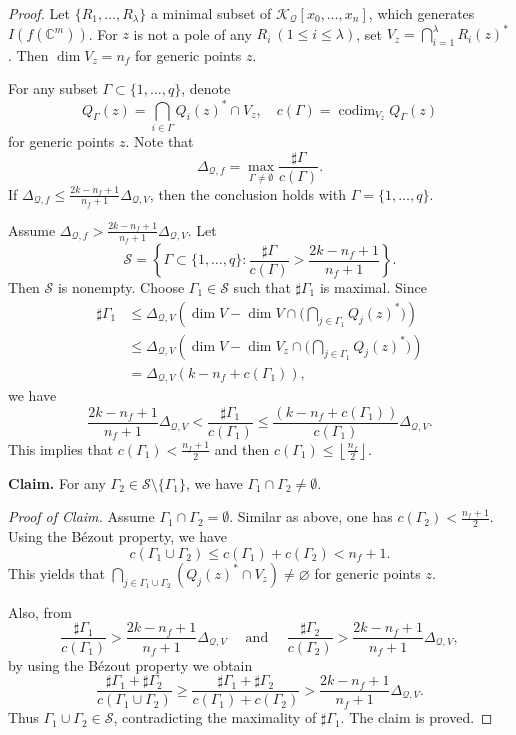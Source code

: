 \documentclass[12pt,leqno]{amsart}
\newcommand{\C}{{\mathbb{C}}}
\numberwithin{equation}{section}
\begin{document}
\begin{proof} 
Let $\{R_1,\ldots,R_\lambda\}$ a minimal subset of $\mathcal K_{\mathcal Q}[x_0,\ldots,x_n]$, which generates $I(f(\C^m))$. 
For $z$ is not a pole of any $R_i\ (1\le i\le \lambda)$, set $V_z=\bigcap_{i=1}^\lambda R_i(z)^*$. Then $\dim V_z=n_f$ for generic points $z$.

For any subset $\Gamma \subset \{1,\ldots,q\}$, denote
$$Q_\Gamma(z) = \bigcap_{i \in \Gamma}Q_i(z)^* \cap V_z, \quad c(\Gamma) = \operatorname{codim}_{V_z} Q_\Gamma(z)$$
for generic points $z$. Note that
$$\Delta_{\mathcal Q,f}= \max_{\Gamma \ne \emptyset} \frac{\sharp\Gamma}{c(\Gamma)}.$$
If $\Delta_{\mathcal Q,f}\le \frac{2k-n_f+1}{n_f+1}\Delta_{\mathcal Q,V}$, then the conclusion holds with $\Gamma = \{1,\ldots,q\}$.

Assume $\Delta_{\mathcal Q,f}>\frac{2k-n_f+1}{n_f+1}\Delta_{\mathcal Q,V}$. Let
$$\mathcal{S} = \left\{ \Gamma \subset \{1,\ldots,q\} : \frac{\sharp\Gamma}{c(\Gamma)} >\frac{2k-n_f+1}{n_f+1}\right\}.$$
Then $\mathcal{S}$ is nonempty. Choose $\Gamma_1 \in \mathcal{S}$ such that $\sharp\Gamma_1$ is maximal. Since 
\begin{align*}
\sharp\Gamma_1&\le \Delta_{\mathcal Q,V}\left(\dim V-\dim V\cap\bigl(\bigcap_{j\in\Gamma_1}Q_j(z)^*\bigl)\right)\\
&\le \Delta_{\mathcal Q,V}\left(\dim V-\dim V_z\cap\bigl(\bigcap_{j\in\Gamma_1}Q_j(z)^*\bigl)\right)\\
&=\Delta_{\mathcal Q,V}\left(k-n_f+c(\Gamma_1)\right),
\end{align*} 
we have
$$\frac{2k-n_f+1}{n_f+1}\Delta_{\mathcal Q,V}<\frac{\sharp\Gamma_1}{c(\Gamma_1)}\le \frac{\left(k-n_f+c(\Gamma_1)\right)}{c(\Gamma_1)}\Delta_{\mathcal Q,V}.$$
This implies that $c(\Gamma_1)<\frac{n_f+1}{2}$ and then $c(\Gamma_1)\le \left\lfloor\frac{n_f}{2}\right\rfloor$.

\medskip
\noindent \textbf{Claim.} For any $\Gamma_2 \in \mathcal{S}\setminus\{\Gamma_1\}$, we have $\Gamma_1 \cap \Gamma_2 \ne \emptyset$.
\medskip

\noindent \textit{Proof of Claim.}
Assume $\Gamma_1 \cap \Gamma_2 = \emptyset$. Similar as above, one has $c(\Gamma_2)<\frac{n_f+1}{2}$.  Using the B\'ezout property, we have
$$c(\Gamma_1 \cup \Gamma_2) \le c(\Gamma_1) + c(\Gamma_2)<n_f+1.$$
This yields that $\bigcap_{j\in \Gamma_1 \cup \Gamma_2}(Q_j(z)^*\cap V_z)\ne\varnothing$ for generic points $z$.

Also, from
$$\frac{\sharp\Gamma_1}{c(\Gamma_1)} > \frac{2k-n_f+1}{n_f+1}\Delta_{\mathcal Q,V} \quad\text{ and }\quad \frac{\sharp\Gamma_2}{c(\Gamma_2)} > \frac{2k-n_f+1}{n_f+1}\Delta_{\mathcal Q,V},$$
by using the B\'ezout property we obtain
$$\frac{\sharp\Gamma_1 + \sharp\Gamma_2}{c(\Gamma_1 \cup \Gamma_2)}\ge \frac{\sharp\Gamma_1+\sharp\Gamma_2}{c(\Gamma_1) + c(\Gamma_2)} > \frac{2k-n_f+1}{n_f+1}\Delta_{\mathcal Q,V}.$$
Thus $\Gamma_1 \cup \Gamma_2 \in \mathcal{S}$, contradicting the maximality of $\sharp\Gamma_1$. 
The claim is proved.


\end{proof}
\end{document}

